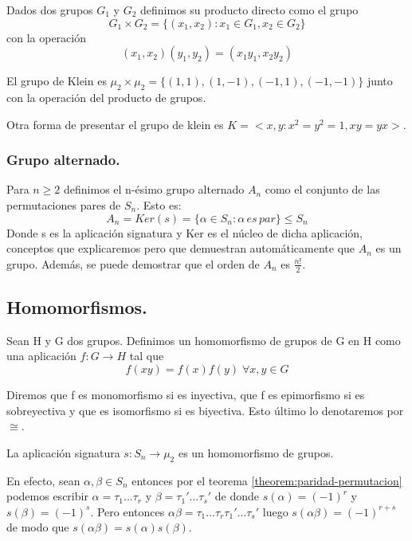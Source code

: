 \begin{ndef}
Dados dos grupos $G_1$ y $G_2$ definimos su producto directo como el grupo $$G_1 \times G_2 = \{(x_1,x_2):x_1 \in G_1,x_2 \in G_2\}$$ con la operación $$(x_1,x_2)(y_1,y_2) = (x_1y_1,x_2y_2)$$
\end{ndef}

El grupo de Klein es $\mu_2 \times \mu_2 = \{(1,1),(1,-1),(-1,1),(-1,-1)\}$ junto con la operación del producto de grupos.

Otra forma de presentar el grupo de klein es $K = <x,y : x^2 = y^2 = 1, xy = yx>$.

\subsubsection{Grupo alternado.}

Para $n \ge 2$ definimos el n-ésimo grupo alternado $A_n$ como el conjunto de las permutaciones pares de $S_n$. Esto es: $$A_n = Ker(s) = \{\alpha \in S_n : \alpha \, es \, par\} \le S_n$$ Donde s es la aplicación signatura y Ker es el núcleo de dicha aplicación, conceptos que explicaremos pero que demuestran automáticamente que $A_n$ es un grupo. Además, se puede demostrar que el orden de $A_n$ es $\frac{n!}{2}$.

\subsection{Homomorfismos.}

\begin{ndef}
Sean H y G dos grupos. Definimos un homomorfismo de grupos de G en H como una aplicación $f:G \rightarrow H$ tal que $$f(xy) = f(x)f(y) \; \forall x,y \in G$$

Diremos que f es monomorfismo si es inyectiva, que f es epimorfismo si es sobreyectiva y que es isomorfismo si es biyectiva. Esto último lo denotaremos por $\cong$.
\end{ndef}

\begin{ejemplo}
La aplicación signatura $s:S_n \rightarrow \mu_2$ es un homomorfismo de grupos.

En efecto, sean $\alpha,\beta \in S_n$ entonces por el teorema \ref{theorem:paridad-permutacion} podemos escribir $\alpha = \tau_1...\tau_r$ y $\beta = \tau_1'...\tau_s'$ de donde $s(\alpha) = (-1)^r$ y $s(\beta) = (-1)^s$. Pero entonces $\alpha\beta = \tau_1...\tau_r\tau_1'...\tau_s'$ luego $s(\alpha\beta) = (-1)^{r+s}$ de modo que $s(\alpha\beta) = s(\alpha)s(\beta)$.
\end{ejemplo}

